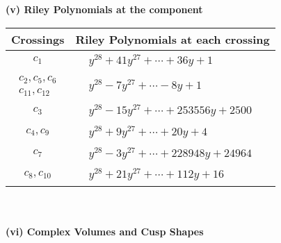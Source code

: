 \documentclass[1p]{elsarticle_modified}
\theoremstyle{definition}
\begin{document}
\newpage\renewcommand{\arraystretch}{1}
\flushleft \textbf{(v) Riley Polynomials at the component}\newline \\
\begin{tabular}{m{50pt}|m{274pt}}
Crossings & \hspace{64pt}Riley Polynomials at each crossing \\
\hline $$\begin{aligned}c_{1}\end{aligned}$$&$\begin{aligned}
&y^{28}+41 y^{27}+\cdots+36 y+1
\end{aligned}$\\
\hline $$\begin{aligned}c_{2},c_{5},c_{6}\\c_{11},c_{12}\end{aligned}$$&$\begin{aligned}
&y^{28}-7 y^{27}+\cdots-8 y+1
\end{aligned}$\\
\hline $$\begin{aligned}c_{3}\end{aligned}$$&$\begin{aligned}
&y^{28}-15 y^{27}+\cdots+253556 y+2500
\end{aligned}$\\
\hline $$\begin{aligned}c_{4},c_{9}\end{aligned}$$&$\begin{aligned}
&y^{28}+9 y^{27}+\cdots+20 y+4
\end{aligned}$\\
\hline $$\begin{aligned}c_{7}\end{aligned}$$&$\begin{aligned}
&y^{28}-3 y^{27}+\cdots+228948 y+24964
\end{aligned}$\\
\hline $$\begin{aligned}c_{8},c_{10}\end{aligned}$$&$\begin{aligned}
&y^{28}+21 y^{27}+\cdots+112 y+16
\end{aligned}$\\
\hline
\end{tabular}\\~\\
\newpage\flushleft \textbf{(vi) Complex Volumes and Cusp Shapes}
\end{document}
